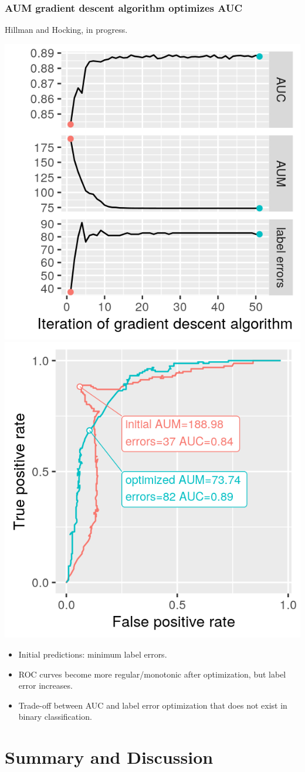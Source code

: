 \documentclass{beamer}
\begin{document}
\begin{frame}
  \frametitle{AUM gradient descent algorithm optimizes AUC}
  
  Hillman and Hocking, in progress.

  \includegraphics[width=0.49\linewidth]{figure-aum-optimized-iterations-emph}
  \includegraphics[width=0.49\linewidth]{figure-aum-train-pred-only} 

  \begin{itemize}
  \item Initial predictions: minimum label errors.
  \item ROC curves become more regular/monotonic after optimization,
    but label error increases.
  \item Trade-off between AUC and label error optimization that does
    not exist in binary classification.
  \end{itemize}
\end{frame}

\section{Summary and Discussion}
\end{document}
